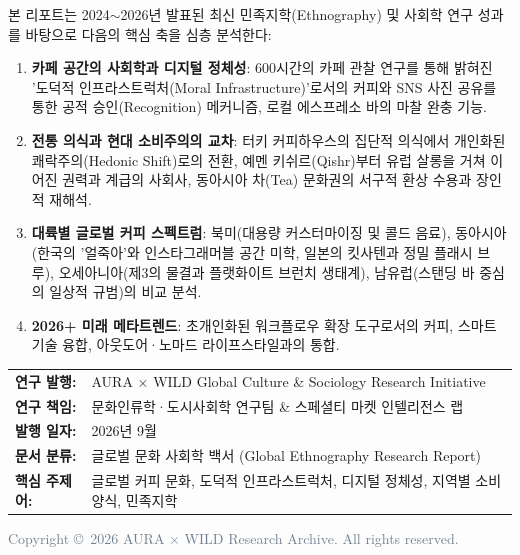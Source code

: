 \documentclass[10pt,a4paper]{article}
\begin{document}
\begin{titlepage}
\begin{tcolorbox}[colback=white,colframe=CoffeeBrown,width=0.94\textwidth]
    본 리포트는 2024$\sim$2026년 발표된 최신 민족지학(Ethnography) 및 사회학 연구 성과를 바탕으로 다음의 핵심 축을 심층 분석한다:
    \begin{enumerate}[itemsep=2pt,leftmargin=1.5em]
        \item \textbf{카페 공간의 사회학과 디지털 정체성}: 600시간의 카페 관찰 연구를 통해 밝혀진 '도덕적 인프라스트럭처(Moral Infrastructure)'로서의 커피와 SNS 사진 공유를 통한 공적 승인(Recognition) 메커니즘, 로컬 에스프레소 바의 마찰 완충 기능.
        \item \textbf{전통 의식과 현대 소비주의의 교차}: 터키 커피하우스의 집단적 의식에서 개인화된 쾌락주의(Hedonic Shift)로의 전환, 예멘 키쉬르(Qishr)부터 유럽 살롱을 거쳐 이어진 권력과 계급의 사회사, 동아시아 차(Tea) 문화권의 서구적 환상 수용과 장인적 재해석.
        \item \textbf{대륙별 글로벌 커피 스펙트럼}: 북미(대용량 커스터마이징 및 콜드 음료), 동아시아(한국의 '얼죽아'와 인스타그래머블 공간 미학, 일본의 킷사텐과 정밀 플래시 브루), 오세아니아(제3의 물결과 플랫화이트 브런치 생태계), 남유럽(스탠딩 바 중심의 일상적 규범)의 비교 분석.
        \item \textbf{2026+ 미래 메타트렌드}: 초개인화된 워크플로우 확장 도구로서의 커피, 스마트 기술 융합, 아웃도어·노마드 라이프스타일과의 통합.
    \end{enumerate}
    \end{tcolorbox}
    
    \vspace{1.0cm}
    
    \begin{minipage}{0.88\textwidth}
    \begin{tabular}{ll}
    \textbf{연구 발행:} & AURA × WILD Global Culture \& Sociology Research Initiative\\
    \textbf{연구 책임:} & 문화인류학·도시사회학 연구팀 \& 스페셜티 마켓 인텔리전스 랩\\
    \textbf{발행 일자:} & 2026년 9월\\
    \textbf{문서 분류:} & 글로벌 문화 사회학 백서 (Global Ethnography Research Report)\\
    \textbf{핵심 주제어:} & 글로벌 커피 문화, 도덕적 인프라스트럭처, 디지털 정체성, 지역별 소비 양식, 민족지학
    \end{tabular}
    \end{minipage}
    
    \vfill
    {\footnotesize\textcolor{SlateGray}{Copyright \copyright\ 2026 AURA × WILD Research Archive. All rights reserved.}}
\end{titlepage}
\end{document}

